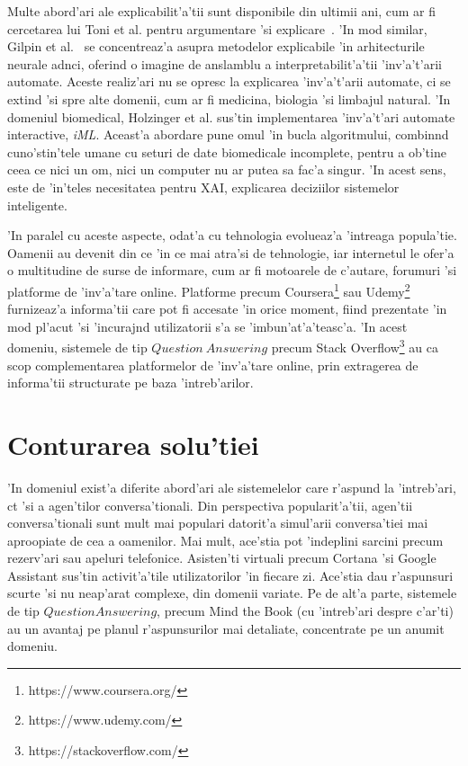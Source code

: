 \documentclass[12pt,a4paper,twoside]{report}
\begin{document}
Multe abord'ari ale explicabilit'a'tii sunt disponibile din ultimii ani, cum ar fi cercetarea lui Toni et al. pentru argumentare 'si explicare~\cite{ANNWithXAI}. 'In mod similar, Gilpin et al.~\cite{Gilpin2019ExplainingLearning} se concentreaz'a asupra metodelor explicabile 'in arhitecturile neurale ad\ia nci, oferind o imagine de anslamblu a interpretabilit'a'tii 'inv'a't'arii automate. Aceste realiz'ari nu se opresc la explicarea 'inv'a't'arii automate, ci se extind 'si spre alte domenii, cum ar fi medicina, biologia 'si limbajul natural. 
'In domeniul biomedical, Holzinger et al. \cite{Holzinger2018FromAI} sus'tin implementarea 'inv'a't'ari automate interactive, {\it iML}. Aceast'a abordare pune omul 'in bucla algoritmului, combin\ia nd cuno'stin'tele umane cu seturi de date biomedicale incomplete, pentru a ob'tine ceea ce nici un om, nici un computer nu ar putea sa fac'a singur. 'In acest sens, este de 'in'teles necesitatea pentru XAI, explicarea deciziilor sistemelor inteligente. 

'In paralel cu aceste aspecte, odat'a cu tehnologia evolueaz'a 'intreaga popula'tie. Oamenii au devenit din ce 'in ce mai atra'si de tehnologie, iar internetul le ofer'a o multitudine de surse de informare, cum ar fi motoarele de c'autare, forumuri 'si platforme de 'inv'a'tare online. Platforme precum  Coursera\footnote{https://www.coursera.org/} sau Udemy\footnote{https://www.udemy.com/} furnizeaz'a informa'tii care pot fi accesate 'in orice moment, fiind prezentate 'in mod pl'acut 'si 'incuraj\ia nd utilizatorii s'a se 'imbun'at'a'teasc'a. 'In acest domeniu, sistemele de tip $Question\ Answering$ precum Stack Overflow\footnote{https://stackoverflow.com/} au ca scop complementarea platformelor de 'inv'a'tare online, prin extragerea de informa'tii structurate pe baza 'intreb'arilor.

\section{Conturarea solu'tiei}
'In domeniul  exist'a diferite abord'ari ale sistemelelor care r'aspund la 'intreb'ari, c\ia t 'si a agen'tilor conversa'tionali. Din perspectiva popularit'a'tii, agen'tii conversa'tionali sunt mult mai populari datorit'a simul'arii conversa'tiei mai aproopiate de cea a oamenilor. Mai mult, ace'stia pot 'indeplini sarcini precum rezerv'ari sau apeluri telefonice. Asisten'ti virtuali precum Cortana 'si Google Assistant sus'tin activit'a'tile utilizatorilor 'in fiecare zi. Ace'stia dau r'aspunsuri scurte 'si nu neap'arat complexe, din domenii variate. Pe de alt'a parte, sistemele de tip $Question Answering$, precum Mind the Book (cu 'intreb'ari despre c'ar'ti) au un avantaj pe planul r'aspunsurilor mai detaliate, concentrate pe un anumit domeniu.
\end{document}
